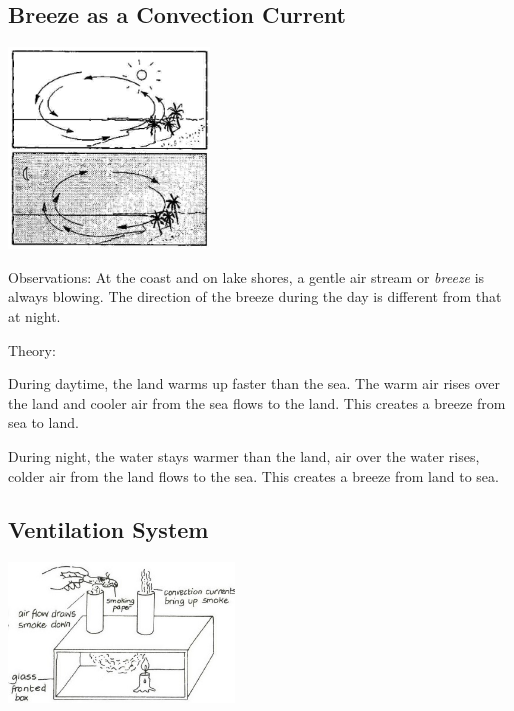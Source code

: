 \begin{multicols}{2}
\subsection{Breeze as a Convection Current}

\begin{center}
\includegraphics[width=0.4\textwidth]{./img/source/breeze-2.jpg}
\end{center}

\begin{description*}
\item[Observations:]{At the coast and on lake shores, a gentle air stream or \emph{breeze} is always blowing. The direction of the breeze during the day is different from that at night.}
\item[Theory:]{During daytime, the land warms up faster than the sea. The warm air rises over the land and cooler air from the sea flows to the land. This creates a breeze from sea to land.

During night, the water stays warmer than the land, air over the water rises, colder air from the land flows to the sea. This creates a breeze from land to sea.}
\end{description*}

\columnbreak

\subsection{Ventilation System}

\begin{center}
\includegraphics[width=0.45\textwidth]{./img/vso/ventilation-system.jpg}
\end{center}


\end{multicols}
